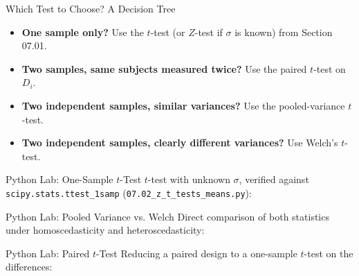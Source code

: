 \documentclass[10pt, aspectratio=169]{beamer}
\begin{document}
\begin{frame}{Which Test to Choose? A Decision Tree}
  \footnotesize
  \begin{itemize}\itemsep=0.12cm
    \item \textbf{One sample only?} Use the $t$-test (or $Z$-test if $\sigma$ is known) from Section 07.01. \pause
    \item \textbf{Two samples, same subjects measured twice?} Use the paired $t$-test on $D_i$. \pause
    \item \textbf{Two independent samples, similar variances?} Use the pooled-variance $t$-test. \pause
    \item \textbf{Two independent samples, clearly different variances?} Use Welch's $t$-test.
  \end{itemize}
\end{frame}

\begin{frame}[fragile]{Python Lab: One-Sample $t$-Test}
  \scriptsize
  $t$-test with unknown $\sigma$, verified against \texttt{scipy.stats.ttest\_1samp} (\texttt{07.02\_z\_t\_tests\_means.py}):
  {
  }
\end{frame}

\begin{frame}[fragile]{Python Lab: Pooled Variance vs. Welch}
  \scriptsize
  Direct comparison of both statistics under homoscedasticity and heteroscedasticity:
  {
  }
\end{frame}

\begin{frame}[fragile]{Python Lab: Paired $t$-Test}
  \scriptsize
  Reducing a paired design to a one-sample $t$-test on the differences:
  {
  }
\end{frame}
\end{document}
